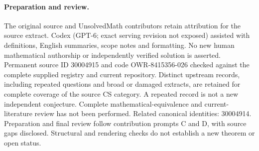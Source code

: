 \documentclass[11pt]{article}
\begin{document}
\paragraph{Preparation and review.}
The original source and UnsolvedMath contributors retain attribution for the source extract. Codex (GPT-6; exact serving revision not exposed) assisted with definitions, English summaries, scope notes and formatting. No new human mathematical authorship or independently verified solution is asserted. Permanent source ID 30004915 and code OWR-8415356-026 checked against the complete supplied registry and current repository. Distinct upstream records, including repeated questions and broad or damaged extracts, are retained for complete coverage of the source CS category. A repeated record is not a new independent conjecture. Complete mathematical-equivalence and current-literature review has not been performed. Related canonical identities: 30004914. Preparation and final review follow contribution prompts C and D, with source gaps disclosed. Structural and rendering checks do not establish a new theorem or open status.
\label{end:30004915}
\end{document}
